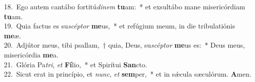 {18.~}Ego autem cantábo fortitú\textit{di}\textit{nem} \textbf{tu}am:~* et exsultábo mane misericórdiam \textbf{tu}am.\\
{19.~}Quia factus es su\textit{scép}\textit{tor} \textbf{me}us,~* et refúgium meum, in die tribulatiónis \textbf{me}æ.\\
{20.~}Adjútor meus, tibi psallam,~† quia, Deus, su\textit{scép}\textit{tor} \textbf{me}us es:~* Deus meus, misericórdia \textbf{me}a.\\
{21.~}Glória Pa\textit{tri}, \textit{et} \textbf{Fí}lio,~* et Spirítui \textbf{San}cto.\\
{22.~}Sicut erat in princípio, et \textit{nunc}, \textit{et} \textbf{sem}per,~* et in sǽcula sæculórum. \textbf{A}men.\\

